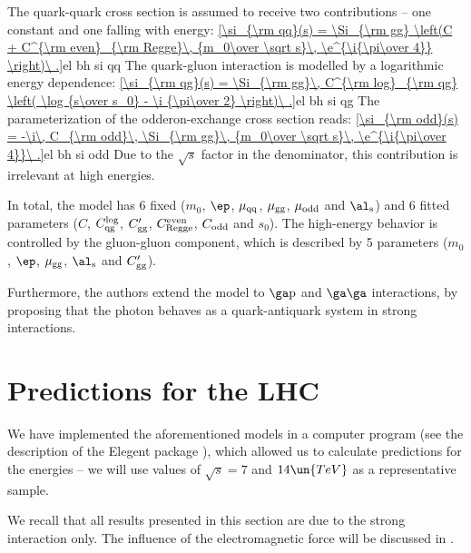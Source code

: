 The quark-quark cross section is assumed to receive two contributions -- one constant and one falling with energy:
\eqref{\si_{\rm qq}(s) = \Si_{\rm gg} \left(C + C^{\rm even}_{\rm Regge}\, {m_0\over \sqrt s}\, \e^{\i{\pi\over 4}} \right)\ .}{el bh si qq}
The quark-gluon interaction is modelled by a logarithmic energy dependence:
\eqref{\si_{\rm qg}(s) = \Si_{\rm gg}\, C^{\rm log}_{\rm qg} \left( \log {s\over s_0} - \i {\pi\over 2} \right)\ .}{el bh si qg}
The parameterization of the odderon-exchange cross section reads:
\eqref{\si_{\rm odd}(s) = -\i\, C_{\rm odd}\, \Si_{\rm gg}\, {m_0\over \sqrt s}\,  \e^{\i{\pi\over 4}}\ .}{el bh si odd}
Due to the $\sqrt s$ factor in the denominator, this contribution is irrelevant at high energies.


In total, the model has 6 fixed ($m_0$, $\ep$, $\mu_{\rm qq}$, $\mu_{\rm gg}$, $\mu_{\rm odd}$ and $\al_{\rm s}$) and 6 fitted parameters ($C$, $C^{\rm log}_{\rm qg}$, $C'_{\rm gg}$, $C^{\rm even}_{\rm Regge}$, $C_{\rm odd}$ and $s_0$). The high-energy behavior is controlled by the gluon-gluon component, which is described by 5 parameters ($m_0$, $\ep$, $\mu_{\rm gg}$, $\al_{\rm s}$ and $C'_{\rm gg}$).

Furthermore, the authors extend the model to $\rm\ga p$ and $\rm\ga\ga$ interactions, by proposing that the photon behaves as a quark-antiquark system in strong interactions.




\section[el pred]{Predictions for the LHC}

We have implemented the aforementioned models in a computer program (see the description of the Elegent package ), which allowed us to calculate predictions for the  energies -- we will use values of $\sqrt s = 7$ and $14\un{TeV}$ as a representative sample.

We recall that all results presented in this section are due to the strong interaction only. The influence of the electromagnetic force will be discussed in .

